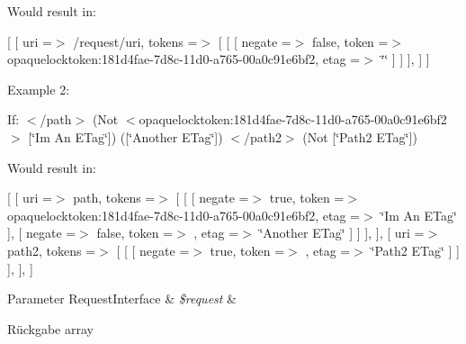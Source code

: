 Would result in\+:

\mbox{[} \mbox{[} \textquotesingle{}uri\textquotesingle{} =$>$ \textquotesingle{}/request/uri\textquotesingle{}, \textquotesingle{}tokens\textquotesingle{} =$>$ \mbox{[} \mbox{[} \mbox{[} \textquotesingle{}negate\textquotesingle{} =$>$ false, \textquotesingle{}token\textquotesingle{} =$>$ \textquotesingle{}opaquelocktoken\+:181d4fae-\/7d8c-\/11d0-\/a765-\/00a0c91e6bf2\textquotesingle{}, \textquotesingle{}etag\textquotesingle{} =$>$ \char`\"{}\char`\"{} \mbox{]} \mbox{]} \mbox{]}, \mbox{]} \mbox{]}

Example 2\+:

If\+: $<$/path$>$ (Not $<$opaquelocktoken\+:181d4fae-\/7d8c-\/11d0-\/a765-\/00a0c91e6bf2$>$ \mbox{[}\char`\"{}\+Im An E\+Tag\char`\"{}\mbox{]}) (\mbox{[}\char`\"{}\+Another E\+Tag\char`\"{}\mbox{]}) $<$/path2$>$ (Not \mbox{[}\char`\"{}\+Path2 E\+Tag\char`\"{}\mbox{]})

Would result in\+:

\mbox{[} \mbox{[} \textquotesingle{}uri\textquotesingle{} =$>$ \textquotesingle{}path\textquotesingle{}, \textquotesingle{}tokens\textquotesingle{} =$>$ \mbox{[} \mbox{[} \mbox{[} \textquotesingle{}negate\textquotesingle{} =$>$ true, \textquotesingle{}token\textquotesingle{} =$>$ \textquotesingle{}opaquelocktoken\+:181d4fae-\/7d8c-\/11d0-\/a765-\/00a0c91e6bf2\textquotesingle{}, \textquotesingle{}etag\textquotesingle{} =$>$ \textquotesingle{}\char`\"{}\+Im An E\+Tag\char`\"{}\textquotesingle{} \mbox{]}, \mbox{[} \textquotesingle{}negate\textquotesingle{} =$>$ false, \textquotesingle{}token\textquotesingle{} =$>$ \textquotesingle{}\textquotesingle{}, \textquotesingle{}etag\textquotesingle{} =$>$ \textquotesingle{}\char`\"{}\+Another E\+Tag\char`\"{}\textquotesingle{} \mbox{]} \mbox{]} \mbox{]}, \mbox{]}, \mbox{[} \textquotesingle{}uri\textquotesingle{} =$>$ \textquotesingle{}path2\textquotesingle{}, \textquotesingle{}tokens\textquotesingle{} =$>$ \mbox{[} \mbox{[} \mbox{[} \textquotesingle{}negate\textquotesingle{} =$>$ true, \textquotesingle{}token\textquotesingle{} =$>$ \textquotesingle{}\textquotesingle{}, \textquotesingle{}etag\textquotesingle{} =$>$ \textquotesingle{}\char`\"{}\+Path2 E\+Tag\char`\"{}\textquotesingle{} \mbox{]} \mbox{]} \mbox{]}, \mbox{]}, \mbox{]}


\begin{DoxyParams}[1]{Parameter}
Request\+Interface & {\em \$request} & \\
\hline
\end{DoxyParams}
\begin{DoxyReturn}{Rückgabe}
array 
\end{DoxyReturn}


